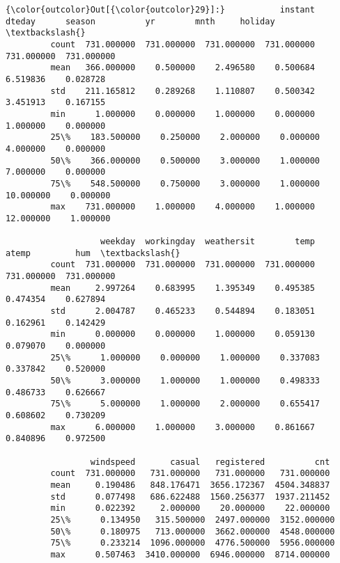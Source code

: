\documentclass[11pt]{article}
\begin{document}
\begin{Verbatim}[commandchars=\\\{\}]
{\color{outcolor}Out[{\color{outcolor}29}]:}           instant      dteday      season          yr        mnth     holiday  \textbackslash{}
         count  731.000000  731.000000  731.000000  731.000000  731.000000  731.000000   
         mean   366.000000    0.500000    2.496580    0.500684    6.519836    0.028728   
         std    211.165812    0.289268    1.110807    0.500342    3.451913    0.167155   
         min      1.000000    0.000000    1.000000    0.000000    1.000000    0.000000   
         25\%    183.500000    0.250000    2.000000    0.000000    4.000000    0.000000   
         50\%    366.000000    0.500000    3.000000    1.000000    7.000000    0.000000   
         75\%    548.500000    0.750000    3.000000    1.000000   10.000000    0.000000   
         max    731.000000    1.000000    4.000000    1.000000   12.000000    1.000000   
         
                   weekday  workingday  weathersit        temp       atemp         hum  \textbackslash{}
         count  731.000000  731.000000  731.000000  731.000000  731.000000  731.000000   
         mean     2.997264    0.683995    1.395349    0.495385    0.474354    0.627894   
         std      2.004787    0.465233    0.544894    0.183051    0.162961    0.142429   
         min      0.000000    0.000000    1.000000    0.059130    0.079070    0.000000   
         25\%      1.000000    0.000000    1.000000    0.337083    0.337842    0.520000   
         50\%      3.000000    1.000000    1.000000    0.498333    0.486733    0.626667   
         75\%      5.000000    1.000000    2.000000    0.655417    0.608602    0.730209   
         max      6.000000    1.000000    3.000000    0.861667    0.840896    0.972500   
         
                 windspeed       casual   registered          cnt  
         count  731.000000   731.000000   731.000000   731.000000  
         mean     0.190486   848.176471  3656.172367  4504.348837  
         std      0.077498   686.622488  1560.256377  1937.211452  
         min      0.022392     2.000000    20.000000    22.000000  
         25\%      0.134950   315.500000  2497.000000  3152.000000  
         50\%      0.180975   713.000000  3662.000000  4548.000000  
         75\%      0.233214  1096.000000  4776.500000  5956.000000  
         max      0.507463  3410.000000  6946.000000  8714.000000  
\end{Verbatim}
            
\end{document}
